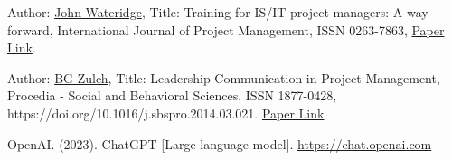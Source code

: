 \documentclass[runningheads]{llncs}
\begin{document}
\begin{thebibliography}{8}
Author: \href{https://www.scopus.com/authid/detail.uri?authorId=6602223274}{John Wateridge},
Title: Training for IS/IT project managers: A way forward, International Journal of Project Management, ISSN 0263-7863, \href{https://doi.org/10.1016/S0263-7863(96)00085-3}{Paper Link}.

Author: \href{https://scholar.google.com/citations?user=WjhruLQAAAAJ&hl=en}{BG Zulch},
Title: Leadership Communication in Project Management, Procedia - Social and Behavioral Sciences, ISSN 1877-0428, https://doi.org/10.1016/j.sbspro.2014.03.021.
\href{https://www.sciencedirect.com/science/article/pii/S1877042814021120}{Paper Link}

OpenAI. (2023). ChatGPT [Large language model]. \url{https://chat.openai.com}
\end{thebibliography}
\end{document}
